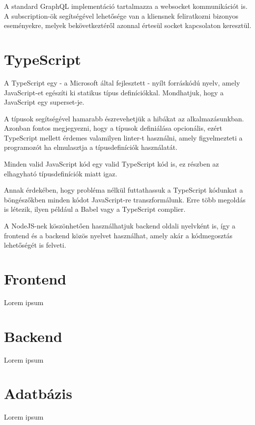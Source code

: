 \begin{definition}[Subscription]
  A standard GraphQL implementáció tartalmazza a websocket kommunikációt is. A subscription-ök segítségével lehetősége van a kliensnek feliratkozni bizonyos eseményekre, melyek bekövetkeztéről azonnal értesül socket kapcsolaton keresztül.
\end{definition}


\section{TypeScript}

A TypeScript egy - a Microsoft által fejlesztett - nyílt forráskódú nyelv, amely JavaScript-et egészíti ki statikus típus definíciókkal. Mondhatjuk, hogy a JavaScript egy superset-je.

A típusok segítségével hamarabb észrevehetjük a hibákat az alkalmazásunkban. Azonban fontos megjegyezni, hogy a típusok definiálása opcionális, ezért TypeScript mellett érdemes valamilyen linter-t használni, amely figyelmezteti a programozót ha elmulasztja a típusdefiníciók használatát. 

Minden valid JavaScript kód egy valid TypeScript kód is, ez részben az elhagyható típusdefiníciók miatt igaz.

Annak érdekében, hogy probléma nélkül futtathassuk a TypeScript kódunkat a böngészőkben minden kódot JavaScript-re transzformálunk. Erre több megoldás is létezik, ilyen például a Babel vagy a TypeScript complier.

A NodeJS-nek köszönhetően használhatjuk backend oldali nyelvként is, így a frontend és a backend közös nyelvet használhat, amely akár a kódmegosztás lehetőségét is felveti.

\section{Frontend}

Lorem ipsum

\section{Backend}

Lorem ipsum

\section{Adatbázis}

Lorem ipsum
